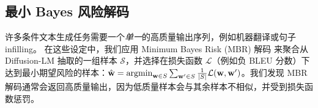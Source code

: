 \subsection{最小 Bayes 风险解码}
\label{ssec:mbr1}
许多条件文本生成任务需要一个\emph{单一}的高质量输出序列，例如机器翻译或句子 infilling。
在这些设定中，我们应用 Minimum Bayes Risk (MBR) 解码 \cite{kumar-byrne-2004-minimum} 来聚合从 Diffusion-LM 抽取的一组样本 $\mathcal{S}$，并选择在损失函数 $\mathcal{L}$（例如负 BLEU 分数）下达到最小期望风险的样本：$\hat{\mathbf{w}} = \operatorname{argmin}_{\mathbf{w} \in S} \sum_{\mathbf{w}' \in S} \frac{1}{|S|}\mathcal{L}(\mathbf{w}, \mathbf{w}')$。我们发现 MBR 解码通常会返回高质量输出，因为低质量样本会与其余样本不相似，并受到损失函数惩罚。






